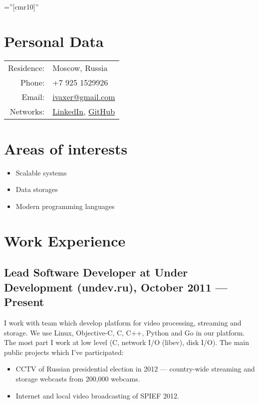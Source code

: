 \documentclass[a4paper,10pt]{article}
\begin{document}
\pagestyle{empty}

\font\fb=''[cmr10]''

\par{\bigskip\par}


\section{Personal Data}

\begin{tabular}{rl}
    Residence:   & Moscow, Russia\\
    Phone:     & +7 925 1529926\\
    Email:     & \href{mailto:ivaxer@gmail.com}{ivaxer@gmail.com} \\
    Networks: & \href{http://www.linkedin.com/in/ivaxer}{LinkedIn}, \href{https://github.com/ivaxer}{GitHub}
\end{tabular}


\section{Areas of interests}
\begin{itemize}
\item Scalable systems
\item Data storages
\item Modern programming languages
\end{itemize}


\section{Work Experience}
\subsection{Lead Software Developer at Under Development (undev.ru), October 2011 --- Present}
I work with team which develop platform for video processing, streaming
and storage. We use Linux, Objective-C, C, C++, Python and Go in our platform.
The most part I work at low level (C, network I/O (libev), disk I/O). The main
public projects which I've participated:
\begin{itemize}
\item CCTV of Russian presidential election in 2012 --- country-wide streaming
and storage webcasts from 200,000 webcams.
\item Internet and local video broadcasting of SPIEF 2012.
\end{itemize}
\end{document}
